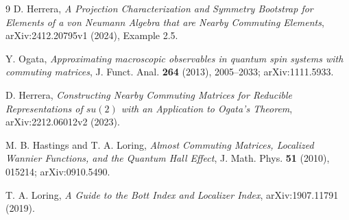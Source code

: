 \documentclass[11pt]{article}
\begin{document}
\begin{thebibliography}{9}
D. Herrera,
\emph{A Projection Characterization and Symmetry Bootstrap for Elements of a
von Neumann Algebra that are Nearby Commuting Elements},
arXiv:2412.20795v1 (2024), Example 2.5.

Y. Ogata,
\emph{Approximating macroscopic observables in quantum spin systems with
commuting matrices}, J. Funct. Anal. \textbf{264} (2013), 2005--2033;
arXiv:1111.5933.

D. Herrera,
\emph{Constructing Nearby Commuting Matrices for Reducible Representations of
$su(2)$ with an Application to Ogata's Theorem}, arXiv:2212.06012v2 (2023).

M. B. Hastings and T. A. Loring,
\emph{Almost Commuting Matrices, Localized Wannier Functions, and the Quantum
Hall Effect}, J. Math. Phys. \textbf{51} (2010), 015214;
arXiv:0910.5490.

T. A. Loring,
\emph{A Guide to the Bott Index and Localizer Index}, arXiv:1907.11791 (2019).
\end{thebibliography}
\end{document}
